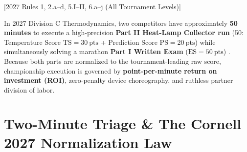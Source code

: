 [2027 Rules 1, 2.a--d, 5.I--II, 6.a--j (All Tournament Levels)]


In 2027 Division C Thermodynamics, two competitors have approximately \textbf{50 minutes} to execute a high-precision \textbf{Part II Heat-Lamp Collector run} (\SI{50}{}: Temperature Score $\mathrm{TS} = \SI{30}{\text{pts}}$ + Prediction Score $\mathrm{PS} = \SI{20}{\text{pts}}$) while simultaneously solving a marathon \textbf{Part I Written Exam} ($\mathrm{ES} = \SI{50}{\text{pts}}$) . Because both parts are normalized to the tournament-leading raw score, championship execution is governed by \textbf{point-per-minute return on investment (ROI)}, zero-penalty device choreography, and ruthless partner division of labor.

\section{Two-Minute Triage \& The Cornell 2027 Normalization Law}\label{sec:21.1}

